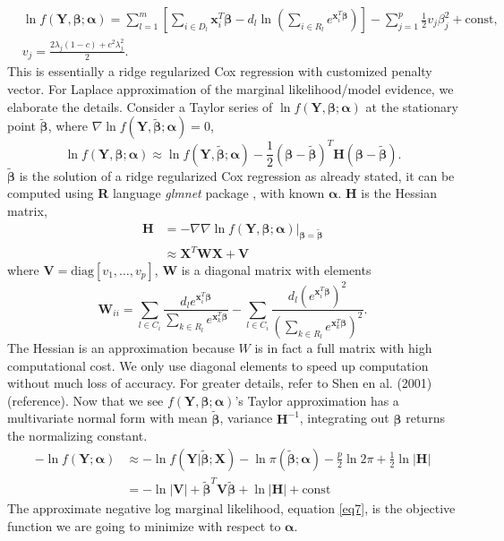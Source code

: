 \documentclass[12pt]{article}
\begin{document}
\begin{equation} \label{eq6}
\begin{aligned}
    &\ln f(\bm{Y}, \bm{\beta};\bm{\alpha}) = \sum_{l=1}^{m}\left[\sum_{i\in D_l}\bm{x}_i^T\bm{\beta}-d_l\ln(\sum_{i\in R_l} e^{\bm{x}_i^T\bm{\beta}})\right] - \sum_{j=1}^{p} \frac{1}{2}v_j\beta_j^2 + \text{const}, \\
    &v_j = \frac{2\lambda_j(1-c)+c^2\lambda_j^2}{2}.
\end{aligned}
\end{equation}
This is essentially a ridge regularized Cox regression with customized penalty vector. 
For Laplace approximation of the marginal likelihood/model evidence, we elaborate the details. Consider a Taylor series of $\ln f(\bm{Y}, \bm{\beta};\bm{\alpha})$ at the stationary point $\widetilde{\bm{\beta}}$, where $\nabla \ln f(\bm{Y}, \widetilde{\bm{\beta}};\bm{\alpha})=0$,
$$ \ln f(\bm{Y}, \bm{\beta};\bm{\alpha}) \approx \ln f(\bm{Y}, \widetilde{\bm{\beta}};\bm{\alpha}) - \frac{1}{2}(\bm{\beta}-\widetilde{\bm{\beta}})^T\bm{H}(\bm{\beta}-\widetilde{\bm{\beta}}). $$
$\widetilde{\bm{\beta}}$ is the solution of a ridge regularized Cox regression as already stated, it can be computed using \textbf{R} language \emph{glmnet} package \citep{simon2011regularization}, with known $\bm{\alpha}$. $\bm{H}$ is the Hessian matrix,
\begin{align*}
    \bm{H} &= - \nabla\nabla \ln f(\bm{Y}, \bm{\beta};\bm{\alpha})|_{\bm{\beta}=\widetilde{\bm{\beta}}} \\
    & \approx \bm{X}^T\bm{W}\bm{X} + \bm{V}
\end{align*}
where $\bm{V} = \text{diag}[v_1,\dots,v_p]$, $\bm{W}$ is a diagonal matrix with elements 
$$ \bm{W}_{ii} = \sum_{l\in C_i}\frac{d_le^{\bm{x}_i^T\bm{\beta}}}{\sum_{k\in R_l}e^{\bm{x}_k^T\bm{\beta}}} - \sum_{l\in C_i}\frac{d_l(e^{\bm{x}_i^T\bm{\beta}})^2}{(\sum_{k\in R_l}e^{\bm{x}_k^T\bm{\beta}})^2}. $$ 
The Hessian is an approximation because $W$ is in fact a full matrix with high computational cost. We only use diagonal elements to speed up computation without much loss of accuracy. For greater details, refer to Shen en al. (2001) (reference).
Now that we see $f(\bm{Y}, \bm{\beta};\bm{\alpha})$'s Taylor approximation has a multivariate normal form with mean $\widetilde{\bm{\beta}}$, variance $\bm{H}^{-1}$, integrating out $\bm{\beta}$ returns the normalizing constant.
\begin{equation} \label{eq7}
\begin{aligned}
    -\ln{f(\bm{Y};\bm{\alpha})} &\approx -\ln f(\bm{Y}|\widetilde{\bm{\beta}};\bm{X}) - \ln \pi(\widetilde{\bm{\beta}};\bm{\alpha}) - \frac{p}{2}\ln{2\pi} + \frac{1}{2}\ln{|\bm{H}|} \\
    &= -\ln{|\bm{V}|} + \widetilde{\bm{\beta}}^T\bm{V}\widetilde{\bm{\beta}} + \ln{|\bm{H}|} + \text{const}
\end{aligned}
\end{equation}
The approximate negative log marginal likelihood, equation \eqref{eq7}, is the objective function we are going to minimize with respect to $\bm{\alpha}$.
\end{document}
